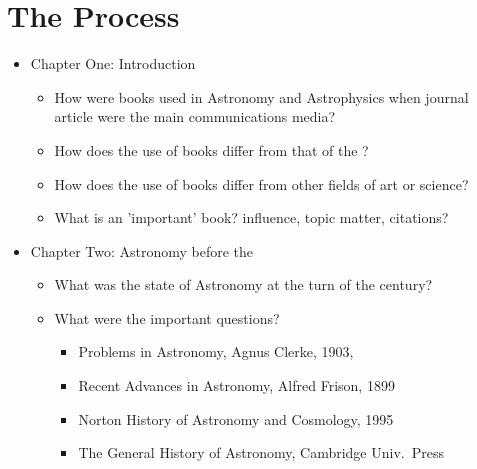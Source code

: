 \chapter{The Process}

\begin{itemize}
	\item Chapter One: Introduction
		\begin{itemize}
			\item How were books used in Astronomy and Astrophysics when journal article
				were the main communications media?
			\item How does the use of books differ from that of the ?
			\item How does the use of books differ from other fields of art or science?
			\item What is an 'important' book? influence, topic matter, citations?
		\end{itemize}
		
	\item Chapter Two: Astronomy before the 
		\begin{itemize}
			\item What was the state of Astronomy at the turn of the century?
			\item What were the important questions?
				\begin{itemize}
					\item Problems in Astronomy, Agnus Clerke, 1903, \cite{clerke:1903}
					\item Recent Advances in Astronomy, Alfred Frison, 1899 \cite{frison:1899}
					\item Norton History of Astronomy and Cosmology, 1995
					\item The General History of Astronomy, Cambridge Univ.\ Press
				\end{itemize}
			\end{itemize}
			

\end{itemize}
